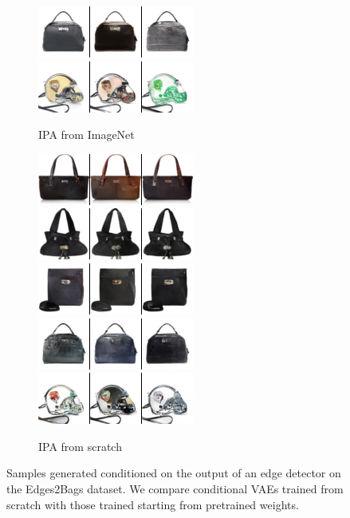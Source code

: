 \begin{figure}[t]
\begin{subfigure}[t]{0.27\textwidth}
      \includegraphics[height=\edgesstuffimgheight]{figs/cigcvae/image-samples/bags/image_aipo_3_imagenet_samples.png}
      \includegraphics[height=\edgesstuffimgheight]{figs/cigcvae/image-samples/bags/image_aipo_4_imagenet_samples.png}
      \caption{\scriptsize IPA from ImageNet}
    \end{subfigure}
    \begin{subfigure}[t]{0.27\textwidth}
      \centering
      \includegraphics[height=\edgesstuffimgheight]{figs/cigcvae/image-samples/bags/image_aipo_0_scratch_samples.png}
      \includegraphics[height=\edgesstuffimgheight]{figs/cigcvae/image-samples/bags/image_aipo_1_scratch_samples.png}
      \includegraphics[height=\edgesstuffimgheight]{figs/cigcvae/image-samples/bags/image_aipo_2_scratch_samples.png}
      \includegraphics[height=\edgesstuffimgheight]{figs/cigcvae/image-samples/bags/image_aipo_3_scratch_samples.png}
      \includegraphics[height=\edgesstuffimgheight]{figs/cigcvae/image-samples/bags/image_aipo_4_scratch_samples.png}
      \caption{\scriptsize IPA from scratch}
    \end{subfigure}
    \caption{Samples generated conditioned on the output of an edge detector on the Edges2Bags dataset. We compare conditional VAEs trained from scratch with those trained starting from pretrained weights.}
    \vspace{-.5cm}
    \label{fig:cigcvae-bags-samples}
  \end{figure}

